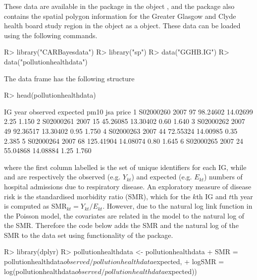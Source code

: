 \documentclass[article, nojss]{jss}
\begin{document}
\hspace{1cm} These data are available in the  package in the object , and the package also contains the spatial polygon information for the Greater Glasgow and Clyde health board study region in the object  as a  object. These data can be loaded using the following commands.




\begin{Schunk}
\begin{Sinput}
R>  library("CARBayesdata")
R>  library("sp")
R>  data("GGHB.IG")
R>  data("pollutionhealthdata")
\end{Sinput}
\end{Schunk}


The data frame  has the following structure

\begin{Schunk}
\begin{Sinput}
R>  head(pollutionhealthdata)
\end{Sinput}
\begin{Soutput}
         IG year observed  expected     pm10  jsa price
1 S02000260 2007       97  98.24602 14.02699 2.25 1.150
2 S02000261 2007       15  45.26085 13.30402 0.60 1.640
3 S02000262 2007       49  92.36517 13.30402 0.95 1.750
4 S02000263 2007       44  72.55324 14.00985 0.35 2.385
5 S02000264 2007       68 125.41904 14.08074 0.80 1.645
6 S02000265 2007       24  55.04868 14.08884 1.25 1.760
\end{Soutput}
\end{Schunk}

where the first column labelled  is the set of unique identifiers for each IG, while  and  are respectively the observed (e.g. $Y_{kt}$) and expected (e.g. $E_{kt}$) numbers of hospital admissions due to respiratory disease. An exploratory measure of disease risk is the standardised morbidity ratio (SMR), which for the $k$th IG and $t$th year is computed as SMR$_{kt}=Y_{kt}/E_{kt}$. However, due to the natural log link function in the Poisson model, the covariates are related in the model to the natural log of the SMR. Therefore the code below adds the SMR and the natural log of the SMR to the data set using functionality of the  package.

\begin{Schunk}
\begin{Sinput}
R>  library(dplyr)
R>  pollutionhealthdata <- pollutionhealthdata %
+           SMR = pollutionhealthdata$observed / pollutionhealthdata$expected, 
+           logSMR = log(pollutionhealthdata$observed / pollutionhealthdata$expected))
\end{Sinput}
\end{Schunk}
\end{document}
